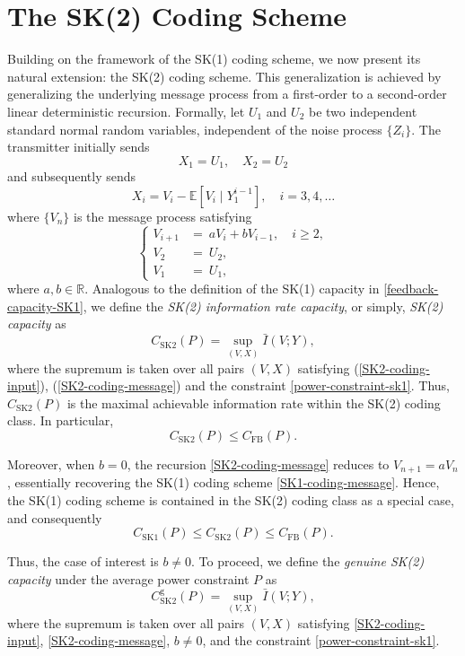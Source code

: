 \documentclass[12pt]{article}
\newcommand{\E}{\mathbb{E}}
\begin{document}
\section{The SK(2) Coding Scheme}\label{sec:sk2-coding-scheme}
Building on the framework of the SK(1) coding scheme, we now present its natural extension: the SK(2) coding scheme. This generalization is achieved by generalizing the underlying message process from a first-order to a second-order linear deterministic recursion. Formally, let $U_1$ and $U_2$ be two independent standard normal random variables, independent of the noise process $\{Z_i\}$. The transmitter initially sends 
$$
X_1 = U_1,\quad X_2 = U_2
$$
and subsequently sends 
\begin{equation}\label{SK2-coding-input}
X_i = V_i - \E{[V_i\mid Y_1^{i-1}]}, \quad i=3,4,\dots
\end{equation}
where $\{V_n\}$ is the message process satisfying 
\begin{equation}\label{SK2-coding-message}
\left\{ 
\begin{aligned}
V_{i+1} &= ~aV_i + bV_{i-1},\quad i\ge2,\\
V_2 ~~&= ~U_2,\\
V_1 ~~&= ~U_1,
\end{aligned}
\right.
\end{equation}
where $a,b\in\mathbb{R}$. Analogous to the definition of the SK(1) capacity in \eqref{feedback-capacity-SK1}, we define the {\em SK(2) information rate capacity}, or simply, {\em SK(2) capacity} as
\begin{equation*}
C_{\mathrm{SK2}}(P) = \sup_{(V,X)} \bar{I}(V;Y),
\end{equation*}
where the supremum is taken over all pairs $(V,X)$ satisfying (\ref{SK2-coding-input}), (\ref{SK2-coding-message}) and the constraint \eqref{power-constraint-sk1}. Thus, $C_{\mathrm{SK2}}(P)$ is the maximal achievable information rate
within the SK(2) coding class. In particular,
$$
    C_{\mathrm{SK2}}(P)\le C_{\mathrm{FB}}(P).
$$

Moreover, when $b=0$, the recursion \eqref{SK2-coding-message} reduces to $V_{n+1}=aV_n$, essentially recovering the SK(1) coding scheme \eqref{SK1-coding-message}. Hence, the SK(1) coding scheme is contained in the SK(2) coding class as a special case, and consequently
\[
    C_{\mathrm{SK1}}(P)\le C_{\mathrm{SK2}}(P)\le C_{\mathrm{FB}}(P).
\]


Thus, the case of interest is $b\neq 0$. To proceed, we define the {\em genuine SK(2) capacity} under the average power constraint $P$ as
\begin{equation*}
C^{\mathrm{g}}_{\mathrm{SK2}}(P)=\sup_{(V,X)}\bar{I}(V;Y),
\end{equation*}
where the supremum is taken over all pairs $(V,X)$ satisfying \eqref{SK2-coding-input}, \eqref{SK2-coding-message}, $b\neq 0$, and the constraint \eqref{power-constraint-sk1}.
\end{document}
